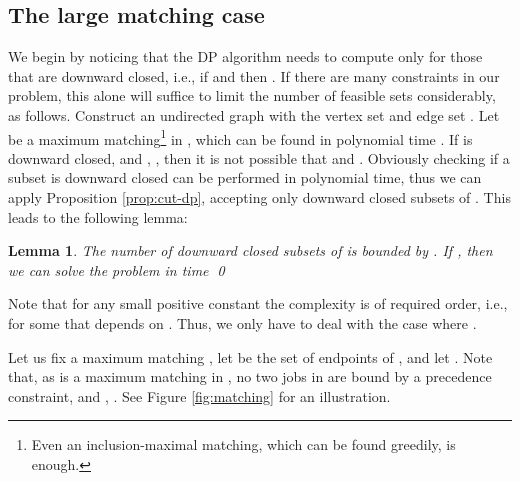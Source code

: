 \documentclass{article}
\newtheorem{lemma}[theorem]{Lemma}
\theoremstyle{definition}
\begin{document}
\subsection{The large matching case}

We begin by noticing that the DP algorithm needs to compute  only for those
 that are downward closed, i.e., if  and  then .
If there are many constraints in our problem, this alone will suffice to limit the number
of feasible sets considerably, as follows.
Construct an undirected graph  with the vertex set  and edge set .
Let  be a maximum matching\footnote{Even an inclusion-maximal matching, which can be found greedily, is enough.}
in , which can be found in polynomial time \cite{mucha-sankowski:matching}.
If  is downward closed, and , , then it is not possible that  and .
Obviously checking if a subset is downward closed can be performed in polynomial time, thus we can apply Proposition \ref{prop:cut-dp},
accepting only downward closed subsets of .
This leads to the following lemma:
\begin{lemma}\label{lem:matching}
The number of downward closed subsets of  is bounded by .
If , then we can solve the \schedname problem in time
\qed
\end{lemma}
Note that for any small positive constant  the complexity  is of required order, i.e., 
 for some  that depends on .
Thus, we only have to deal with the case where .

Let us fix a maximum matching , let  be the set of endpoints of ,
and let .
Note that, as  is a maximum matching in , no two jobs in  are bound by a precedence constraint,
and , .
See Figure \ref{fig:matching} for an illustration.
\end{document}
